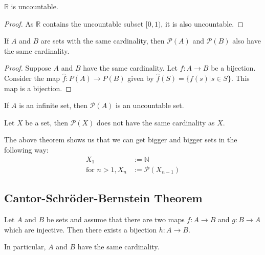 \begin{corollary}
    $ \mathbb{R} $ is uncountable.
\end{corollary}
\begin{proof}[Proof]
    As $ \mathbb{R} $ contains the uncountable subset $ [0,1) $, it is also
    uncountable.
\end{proof}

\begin{theorem}
    If $A$ and $B$ are sets with the same cardinality, then $ \mathscr{P}(A) $
    and $ \mathscr{P}(B) $ also have the same cardinality.
\end{theorem}
\begin{proof}[Proof]
    Suppose $A$ and $B$ have the same cardinality. Let $f : A \to B$ be a
    bijection. Consider the map $\hat{f}:P(A) \to P(B)$ given by $\hat{f}(S)
    = \{f(s) | s \in S\}$. This map is a bijection.
\end{proof}

\begin{corollary}
    If $A$ is an infinite set, then $ \mathscr{P}(A) $ is an uncountable set.
\end{corollary}

\begin{theorem}
    Let $X$ be a set, then $ \mathscr{P}(X) $ does not have the same
    cardinality as $X$.
\end{theorem}

\begin{remark}
    The above theorem shows us that we can get bigger and bigger sets in the following way:
    \begin{align}
        X_1 &:= \mathbb{N} \\
        \text{for } n > 1, X_n &:= \mathscr{P}(X_{n-1})
    \end{align}
\end{remark}

\subsection{Cantor-Schr\"oder-Bernstein Theorem}
\begin{theorem}
    Let $A$ and $B$ be sets and assume that there are two maps $ f:A \to B $ and $ g:B \to A $ which are injective.
    Then there exists a bijection $ h:A \to B $.

    In particular, $A$ and $B$ have the same cardinality.
\end{theorem}

